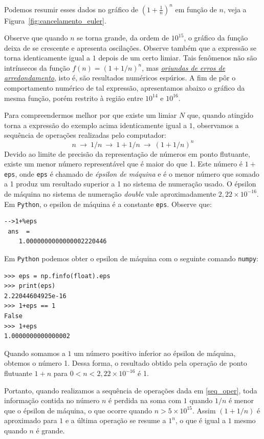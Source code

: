 \begin{ex}
Podemos resumir esses dados no gráfico de $\left(1+\frac{1}{n}\right)^n$ em função de $n$, veja a Figura~\ref{fig:cancelamento_euler}.

Observe que quando $n$ se torna grande, da ordem de $10^{15}$, o gráfico da função deixa de se crescente e apresenta oscilações.  Observe também que a expressão se torna identicamente igual a $1$ depois de um certo limiar. Tais fenômenos não são intrínsecos da função $f(n)=(1+1/n)^n$, mas \emph{\uline{oriundas de erros de arredondamento}}, isto é, são resultados numéricos espúrios. A fim de pôr o comportamento numérico de tal expressão, apresentamos abaixo o gráfico da mesma função, porém restrito à região entre $10^{14}$ e $10^{16}$.

Para compreendermos melhor por que existe um limiar $N$ que, quando atingido torna a expressão do exemplo acima identicamente igual a $1$, observamos a sequência de operações realizadas pelo computador:
\begin{equation}\label{seq_oper}
n~\to ~1/n ~\to ~1+1/n ~\to ~(1+1/n)^n
\end{equation}
Devido ao limite de precisão da representação de números em ponto flutuante, existe um menor número representável que é maior do que 1. Este número é $1 + $\verb+eps+, onde \verb+eps+ é chamado de \emph{épsilon de máquina} e é o menor número que somado a 1 produz um resultado superior a 1 no sistema de numeração usado. O épsilon de máquina no sistema de numeração \emph{double} vale aproximadamente $2,22\times 10^{-16}$.
\ifisscilab
Em \verb+Python+, o epsilon de máquina é a constante \verb+eps+. Observe que:
\begin{verbatim}
-->1+%eps
 ans  =
    1.0000000000000002220446 
\end{verbatim}
\fi
\ifispython
Em \verb+Python+ podemos obter o epsilon de máquina com o seguinte comando \verb+numpy+:
\begin{verbatim}
>>> eps = np.finfo(float).eps
>>> print(eps)
2.22044604925e-16
>>> 1+eps == 1
False
>>> 1+eps
1.0000000000000002
\end{verbatim}
\fi
Quando somamos a $1$ um número positivo inferior ao épsilon de máquina, obtemos o número 1. Dessa forma, o resultado obtido pela operação de ponto flutuante $1+n$ para $0<n<2,22 \times 10^{-16}$ é 1. 

Portanto, quando realizamos a sequência de operações dada em \eqref{seq_oper}, toda informação contida no número $n$ é perdida na soma com $1$ quando $1/n$ é menor que o épsilon de máquina, o que ocorre quando $n>5\times 10^{15}$. Assim $(1+1/n)$ é aproximado para $1$ e a última operação se resume a $1^n$, o que é igual a $1$ mesmo quando $n$ é grande.


\end{ex}
